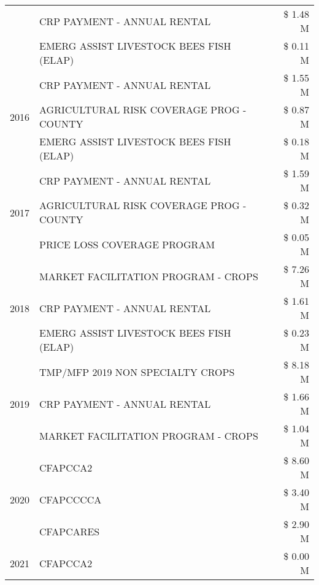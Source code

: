 \begin{tabular}{llr}
 & CRP PAYMENT - ANNUAL RENTAL & \$ 1.48 M \\
 & EMERG ASSIST LIVESTOCK BEES FISH (ELAP) & \$ 0.11 M \\
\cline{1-3}
\multirow[t]{3}{*}{2016} & CRP PAYMENT - ANNUAL RENTAL & \$ 1.55 M \\
 & AGRICULTURAL RISK COVERAGE PROG - COUNTY & \$ 0.87 M \\
 & EMERG ASSIST LIVESTOCK BEES FISH (ELAP) & \$ 0.18 M \\
\cline{1-3}
\multirow[t]{3}{*}{2017} & CRP PAYMENT - ANNUAL RENTAL & \$ 1.59 M \\
 & AGRICULTURAL RISK COVERAGE PROG - COUNTY & \$ 0.32 M \\
 & PRICE LOSS COVERAGE PROGRAM & \$ 0.05 M \\
\cline{1-3}
\multirow[t]{3}{*}{2018} & MARKET FACILITATION PROGRAM - CROPS & \$ 7.26 M \\
 & CRP PAYMENT - ANNUAL RENTAL & \$ 1.61 M \\
 & EMERG ASSIST LIVESTOCK BEES FISH (ELAP) & \$ 0.23 M \\
\cline{1-3}
\multirow[t]{3}{*}{2019} & TMP/MFP 2019 NON SPECIALTY CROPS & \$ 8.18 M \\
 & CRP PAYMENT - ANNUAL RENTAL & \$ 1.66 M \\
 & MARKET FACILITATION PROGRAM - CROPS & \$ 1.04 M \\
\cline{1-3}
\multirow[t]{3}{*}{2020} & CFAPCCA2 & \$ 8.60 M \\
 & CFAPCCCCA & \$ 3.40 M \\
 & CFAPCARES & \$ 2.90 M \\
\cline{1-3}
2021 & CFAPCCA2 & \$ 0.00 M \\
\cline{1-3}
\bottomrule
\end{tabular}
